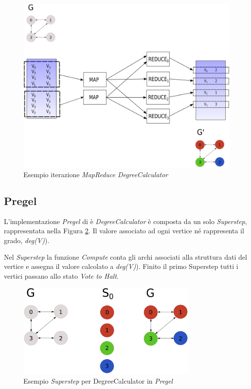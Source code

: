 \documentclass[LaM,binding=0.6cm]{sapthesis}
\begin{document}
\begin{figure}
\centering
\includegraphics[width=1\textwidth]{MR-DegreeCalculator}
\caption{Esempio iterazione \textit{MapReduce DegreeCalculator}}
\label{fig:MRDEGREE}
\end{figure}

\subsection{Pregel}

L'implementazione \textit{Pregel}  di è \textit{DegreeCalculator} è composta da un solo \textit{Superstep}, rappresentata nella Figura \ref{fig:GIRAPHDEGREE}. Il valore associato ad ogni vertice né rappresenta il grado, \textit{deg(V)}).

Nel \textit{Superstep} la funzione \textit{Compute} conta gli archi associati alla struttura dati del vertice e assegna il valore calcolato a \textit{deg(V)}). Finito il primo Superstep tutti i vertici passano allo stato \textit{Vote to Halt}.

\begin{figure}
\centering
\includegraphics[width=0.8\textwidth]{Pregel-DegreeCalculator}
\caption{Esempio  \textit{Superstep} per  DegreeCalculator in \textit{Pregel}}
\label{fig:GIRAPHDEGREE}
\end{figure}
\end{document}
